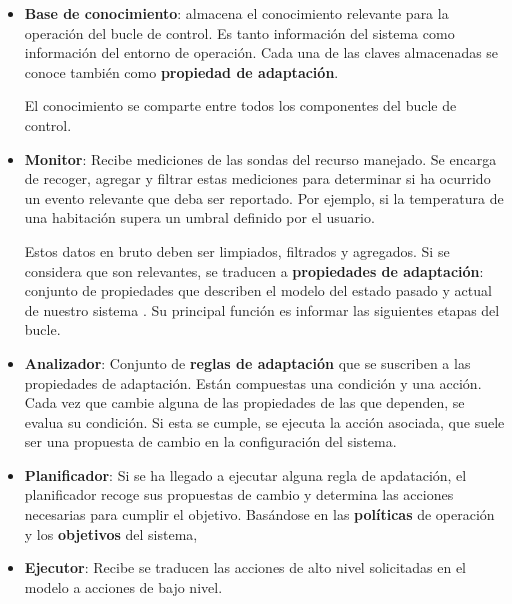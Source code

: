 \begin{itemize}
  \item \textbf{Base de conocimiento}: almacena el conocimiento relevante para la operación del bucle de control. Es tanto información del sistema como información del entorno de operación. Cada una de las claves almacenadas se conoce también como \textbf{propiedad de adaptación}.

  El conocimiento se comparte entre todos los componentes del bucle de control.

  \item \textbf{Monitor}: Recibe mediciones de las sondas del recurso manejado. Se encarga de recoger, agregar y filtrar estas mediciones para determinar si ha ocurrido un evento relevante que deba ser reportado. Por ejemplo, si la temperatura de una habitación supera un umbral definido por el usuario.

  Estos datos en bruto deben ser limpiados, filtrados y agregados. Si se considera que son relevantes, se traducen a \textbf{propiedades de adaptación}: conjunto de propiedades que describen el modelo del estado pasado y actual de nuestro sistema \cite{garlanIncreasingSystemDependability2003}. Su principal función es informar las siguientes etapas del bucle.

  \item \textbf{Analizador}: Conjunto de \textbf{reglas de adaptación} que se suscriben a las propiedades de adaptación. Están compuestas una condición y una acción. Cada vez que cambie alguna de las propiedades de las que dependen, se evalua su condición. Si esta se cumple, se ejecuta la acción asociada, que suele ser una propuesta de cambio en la configuración del sistema.

  \item \textbf{Planificador}: Si se ha llegado a ejecutar alguna regla de apdatación, el planificador recoge sus propuestas de cambio y determina las acciones necesarias para cumplir el objetivo. Basándose en las \textbf{políticas} de operación y los \textbf{objetivos} del sistema,

  \item \textbf{Ejecutor}: Recibe se traducen las acciones de alto nivel solicitadas en el modelo a acciones de bajo nivel.
\end{itemize}
